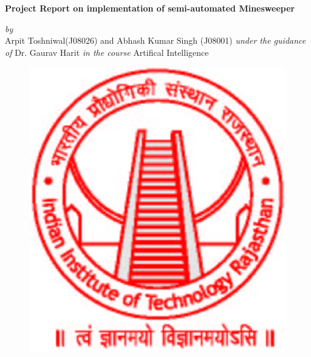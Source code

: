 \documentclass[12pt,a4paper]{report}
\begin{document}
\pagestyle{myheadings} \thispagestyle{empty}

\begin{center}
\baselineskip=24pt {\Large \bf  {
Project Report on implementation of semi-automated Minesweeper
}}

                      \vspace*{1cm}



                      \vspace{5mm}
                   {\em  by} \\
                  
             {
              Arpit Toshniwal(J08026) 
                     and       
              Abhash Kumar Singh (J08001)
              }
              {\em\linebreak under the guidance of}
              {\linebreak Dr. Gaurav Harit}
              {\em\linebreak in the course}
               {\linebreak\large Artifical Intelligence}


                   \vspace{1cm}

\begin{figure}[!h]
\begin{center}
\includegraphics[scale=0.3]{iitrlogo.eps} 
                   \vspace*{1cm}
\baselineskip=24pt
\end{center}
\end{figure}





\end{center}
\end{document}
